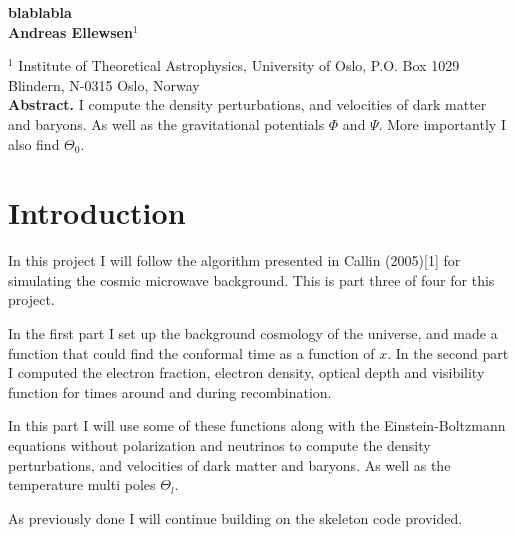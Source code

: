 \documentclass[a4paper]{report}
\begin{document}
  

\vspace*{4ex}

\begin{center}
  {\Large \bf blablabla}\\[4ex]
  {\large \bf Andreas Ellewsen$^1$}\\[4ex]
  \begin{minipage}[t]{15cm}
        $^1$ Institute of Theoretical Astrophysics, University of Oslo, P.O. Box 1029 Blindern, N-0315 Oslo, Norway\\
             
        
    {\bf Abstract.} I compute the density perturbations, and velocities of dark matter and baryons. As well as the gravitational potentials $\Phi$ and $\Psi$. More importantly I also find $\Theta_0$.
    
  \vspace*{2ex}
  \end{minipage}
\end{center}
\section{Introduction}\label{sec:introduction}
In this project I will follow the algorithm presented in Callin (2005)[1] for simulating the cosmic microwave background.  
This is part three of four for this project.

In the first part I set up the background cosmology of the universe, and made a function that could find the conformal time as a function of $x$. In the second part I computed the electron fraction, electron density, optical depth and visibility function for times around and during recombination. 

In this part I will use some of these functions along with the Einstein-Boltzmann equations without polarization and neutrinos to compute the density perturbations, and velocities of dark matter and baryons. As well as the temperature multi poles $\Theta_l$.

As previously done I will continue building on the skeleton code provided.

\end{document}
